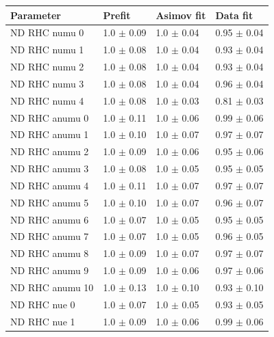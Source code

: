 \begin{table}[ht!]
  \center
  \begin{tabular}{llll}
    \midrule
    Parameter & Prefit & \Gls{Asimov} fit & Data fit \\\midrule

    \Gls{ND} \Gls{RHC} \Gls{numu} 0& 1.0 $\pm$ 0.09 & 1.0 $\pm$ 0.04 & 0.95 $\pm$ 0.04 \\ 
    \Gls{ND} \Gls{RHC} \Gls{numu} 1& 1.0 $\pm$ 0.08 & 1.0 $\pm$ 0.04 & 0.93 $\pm$ 0.04 \\ 
    \Gls{ND} \Gls{RHC} \Gls{numu} 2& 1.0 $\pm$ 0.08 & 1.0 $\pm$ 0.04 & 0.93 $\pm$ 0.04 \\ 
    \Gls{ND} \Gls{RHC} \Gls{numu} 3& 1.0 $\pm$ 0.08 & 1.0 $\pm$ 0.04 & 0.96 $\pm$ 0.04 \\ 
    \Gls{ND} \Gls{RHC} \Gls{numu} 4& 1.0 $\pm$ 0.08 & 1.0 $\pm$ 0.03 & 0.81 $\pm$ 0.03 \\ 
    \Gls{ND} \Gls{RHC} \Gls{anumu} 0& 1.0 $\pm$ 0.11 & 1.0 $\pm$ 0.06 & 0.99 $\pm$ 0.06 \\ 
    \Gls{ND} \Gls{RHC} \Gls{anumu} 1& 1.0 $\pm$ 0.10 & 1.0 $\pm$ 0.07 & 0.97 $\pm$ 0.07 \\ 
    \Gls{ND} \Gls{RHC} \Gls{anumu} 2& 1.0 $\pm$ 0.09 & 1.0 $\pm$ 0.06 & 0.95 $\pm$ 0.06 \\ 
    \Gls{ND} \Gls{RHC} \Gls{anumu} 3& 1.0 $\pm$ 0.08 & 1.0 $\pm$ 0.05 & 0.95 $\pm$ 0.05 \\ 
    \Gls{ND} \Gls{RHC} \Gls{anumu} 4& 1.0 $\pm$ 0.11 & 1.0 $\pm$ 0.07 & 0.97 $\pm$ 0.07 \\ 
    \Gls{ND} \Gls{RHC} \Gls{anumu} 5& 1.0 $\pm$ 0.10 & 1.0 $\pm$ 0.07 & 0.96 $\pm$ 0.07 \\ 
    \Gls{ND} \Gls{RHC} \Gls{anumu} 6& 1.0 $\pm$ 0.07 & 1.0 $\pm$ 0.05 & 0.95 $\pm$ 0.05 \\ 
    \Gls{ND} \Gls{RHC} \Gls{anumu} 7& 1.0 $\pm$ 0.07 & 1.0 $\pm$ 0.05 & 0.96 $\pm$ 0.05 \\ 
    \Gls{ND} \Gls{RHC} \Gls{anumu} 8& 1.0 $\pm$ 0.09 & 1.0 $\pm$ 0.07 & 0.97 $\pm$ 0.07 \\ 
    \Gls{ND} \Gls{RHC} \Gls{anumu} 9& 1.0 $\pm$ 0.09 & 1.0 $\pm$ 0.06 & 0.97 $\pm$ 0.06 \\ 
    \Gls{ND} \Gls{RHC} \Gls{anumu} 10& 1.0 $\pm$ 0.13 & 1.0 $\pm$ 0.10 & 0.93 $\pm$ 0.10 \\ 
    \Gls{ND} \Gls{RHC} \Gls{nue} 0& 1.0 $\pm$ 0.07 & 1.0 $\pm$ 0.05 & 0.93 $\pm$ 0.05 \\ 
    \Gls{ND} \Gls{RHC} \Gls{nue} 1& 1.0 $\pm$ 0.09 & 1.0 $\pm$ 0.06 & 0.99 $\pm$ 0.06 \\ 

\end{tabular}
\end{table}
